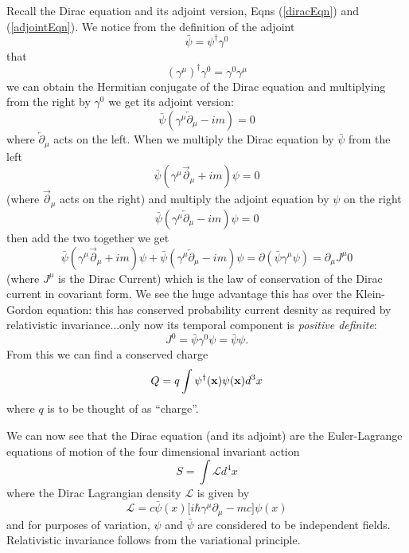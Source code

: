 Recall the Dirac equation and its adjoint version, Eqns (\ref{diracEqn}) and (\ref{adjointEqn}). We notice from the definition of the adjoint
\begin{equation*}
\bar{\psi} = \psi^\dag\gamma^0
\end{equation*}
that
\begin{equation}
\left(\gamma^\mu\right)^\dag\gamma^0 = \gamma^0\gamma^\mu
\end{equation}
we can obtain the Hermitian conjugate of the Dirac equation and multiplying from the right by $\gamma^0$  we get its adjoint version:
\begin{equation*}
\bar{\psi}(\gamma^\mu\overleftarrow{\partial}_\mu - im) = 0
\end{equation*} 
where $\overleftarrow{\partial}_\mu$ acts on the left. When we multiply the Dirac equation by $\bar{\psi}$ from the left
\begin{equation}
\bar{\psi}(\gamma^\mu\overrightarrow{\partial}_\mu + im)\psi = 0
\end{equation}
(where $\overrightarrow{\partial}_\mu$ acts on the right) and multiply the adjoint equation by $\psi$ on the right
\begin{equation}
\bar{\psi}(\gamma^\mu\overleftarrow{\partial}_\mu - im)\psi = 0
\end{equation}
then add the two together we get
\begin{equation}
\bar{\psi}(\gamma^\mu\overrightarrow{\partial}_\mu + im)\psi + \bar{\psi}(\gamma^\mu\overleftarrow{\partial}_\mu - im)\psi = \partial(\bar{\psi}\gamma^\mu\psi) = \partial_\mu J^\mu 0
\end{equation}
(where $J^\mu$ is the Dirac Current) which is the law of conservation of the Dirac current in covariant form. We see the huge advantage this has over the Klein-Gordon equation: this has conserved probability current desnity as required by relativistic invariance...only now its temporal component is \emph{positive definite}:
\begin{equation}
J^0 = \bar{\psi}\gamma^0\psi = \bar{\psi}\psi.
\end{equation}
From this we can find a conserved charge
\begin{equation}
Q = q\int \psi^\dag(\bold{x})\psi(\bold{x})d^3x
\end{equation}
where $q$ is to be thought of as ``charge''.

We can now see that the Dirac equation (and its adjoint) are the Euler-Lagrange equations of motion of the four dimensional invariant action
\begin{equation}
S = \int \mathcal{L}d^4x
\end{equation}
where the Dirac Lagrangian density $\mathcal{L}$ is given by
\begin{equation}
\mathcal{L} = c\bar{\psi}(x)\Big[ i\hbar\gamma^\mu\partial_\mu - mc \Big]\psi(x)
\end{equation}
and for purposes of variation, $\psi$ and $\bar{\psi}$ are considered to be independent fields. Relativistic invariance follows from the variational principle.

